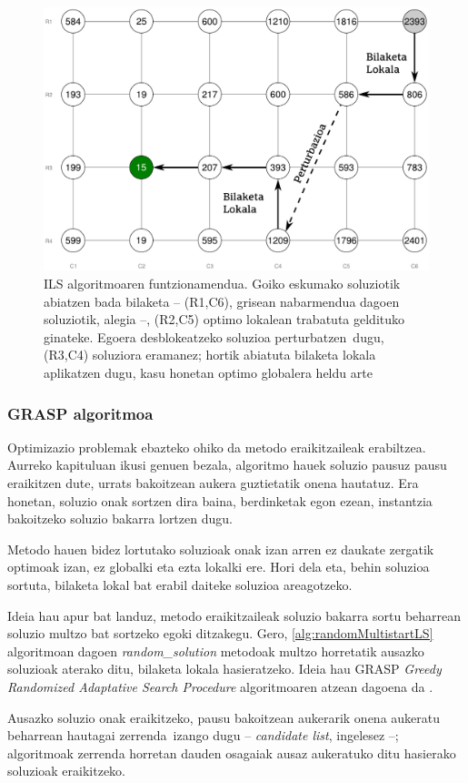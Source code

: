 \documentclass[eu]{ifirak}\usepackage[]{graphicx}\usepackage[]{color}
\newcommand{\zkk}{\guillemotleft}
\newcommand{\skk}{\guillemotright}
\begin{document}
\begin{figure}[t]
\centering
\includegraphics[width=0.66\linewidth]{./Irudiak/ILS}
\caption{ILS algoritmoaren funtzionamendua. Goiko eskumako soluziotik abiatzen bada bilaketa -- (R1,C6), grisean nabarmendua dagoen soluziotik, alegia --, (R2,C5) optimo lokalean trabatuta geldituko ginateke. Egoera desblokeatzeko soluzioa \zkk perturbatzen\skk\ dugu, (R3,C4) soluziora eramanez; hortik abiatuta bilaketa lokala aplikatzen dugu, kasu honetan optimo globalera heldu arte}
\label{fig:ILS}
\end{figure}


\subsubsection{GRASP algoritmoa}

Optimizazio problemak ebazteko ohiko da metodo eraikitzaileak erabiltzea. Aurreko kapituluan ikusi genuen bezala, algoritmo hauek soluzio pausuz pausu eraikitzen dute, urrats bakoitzean aukera guztietatik onena hautatuz. Era honetan, soluzio onak sortzen dira baina, berdinketak egon ezean, instantzia bakoitzeko soluzio bakarra lortzen dugu.

Metodo hauen bidez lortutako soluzioak onak izan arren ez daukate zergatik optimoak izan, ez globalki eta ezta lokalki ere. Hori dela eta, behin soluzioa sortuta, bilaketa lokal bat erabil daiteke soluzioa areagotzeko.

Ideia hau apur bat landuz, metodo eraikitzaileak soluzio bakarra sortu beharrean soluzio multzo bat sortzeko egoki ditzakegu. Gero, \ref{alg:randomMultistartLS} algoritmoan dagoen \textit{random\_solution} metodoak multzo horretatik ausazko soluzioak aterako ditu, bilaketa lokala hasieratzeko. Ideia hau GRASP \textit{Greedy Randomized Adaptative Search Procedure} algoritmoaren atzean dagoena da \cite{feo1989}.

Ausazko soluzio onak eraikitzeko, pausu bakoitzean aukerarik onena aukeratu beharrean \zkk hautagai zerrenda\skk\ izango dugu -- \textit{candidate list}, ingelesez --; algoritmoak zerrenda horretan dauden osagaiak ausaz aukeratuko ditu hasierako soluzioak eraikitzeko.
\end{document}
